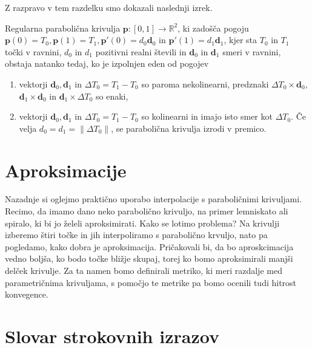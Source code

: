 \documentclass[mat1]{fmfdelo}
\newcommand{\R}{\mathbb R}
\newcommand{\de}{\Delta}
\newcommand{\dd}{\textbf{d}}
\newcommand{\pp}{\textbf{p}}
\begin{document}
Z razpravo v tem razdelku smo dokazali naslednji izrek.
%
\begin{izrek}
Regularna parabolična krivulja $\pp  : [ 0, 1 ] \rightarrow \R^2$, ki zadošča pogoju $\pp(0) = T_0, \pp(1) = T_1, \pp'(0) = d_0 \dd_0$ in $  \pp'(1) = d_1 \dd_1$, kjer sta $T_0$ in $T_1$ točki v ravnini, $d_0$ in $d_1$ pozitivni realni števili in $\dd_0$ in $\dd_1$ smeri v ravnini, obstaja natanko tedaj, ko je izpolnjen eden od pogojev
\begin{enumerate}
\item vektorji $\dd_0, \dd_1$ in $\de T_0 = T_1 - T_0$ so paroma nekolinearni, predznaki $\de T_0 \times \dd_0$, $\dd_1 \times \dd_0$ in $\dd_1 \times \de T_0 $ so enaki,
\item vektorji $\dd_0, \dd_1$ in $\de T_0 = T_1 - T_0$ so kolinearni in imajo isto smer kot $\de T_0$. Če velja $d_0 = d_1 = \lVert \de T_0 \rVert$, se parabolična krivulja izrodi v premico.
\end{enumerate}
\end{izrek}

\section{Aproksimacije}

Nazadnje si oglejmo praktično uporabo interpolacije s paraboličnimi krivuljami. Recimo, da imamo dano neko parabolično krivuljo, na primer lemniskato ali spiralo, ki bi jo želeli aproksimirati. Kako se lotimo problema? Na krivulji izberemo štiri točke in jih interpoliramo s parabolično krvuljo, nato pa pogledamo, kako dobra je aproksimacija. Pričakovali bi, da bo aproskcimacija vedno boljša, ko bodo točke bližje skupaj, torej ko bomo aproksimirali manjši delček krivulje. Za ta namen bomo definirali metriko, ki meri razdalje med parametričnima krivuljama, s pomočjo te metrike pa bomo ocenili tudi hitrost konvegence.


\section*{Slovar strokovnih izrazov}

\geslo{}{}
\geslo{}{}


\begin{thebibliography}{99}


\end{thebibliography}
\end{document}

